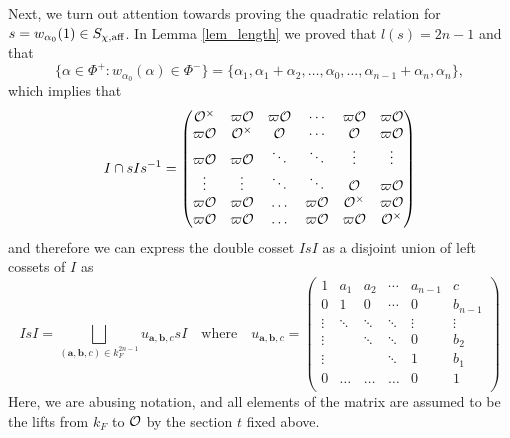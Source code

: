     Next, we turn out attention towards proving the quadratic relation for $s=w_{\alpha_0}(1)\in S_{\chi,\mathrm{aff}}$. In Lemma \ref{lem_length} we proved that $l(s)=2n-1$ and that 
    $$\{\alpha\in\Phi^+:w_{\alpha_0}(\alpha)\in\Phi^-\}=\{\alpha_1,\alpha_1+\alpha_2,\ldots,\alpha_0,\ldots,\alpha_{n-1}+\alpha_n,\alpha_n\},$$
    which implies that
    \begin{equation*}
        I\cap sI s^{-1}=\begin{pmatrix}
            \mathcal{O}^\times&\varpi\mathcal{O}&\varpi\mathcal{O}&\cdots&\varpi\mathcal{O}&\varpi\mathcal{O}\\
            \varpi\mathcal{O}&\mathcal{O}^\times&\mathcal{O}&\cdots&\mathcal{O}&\varpi\mathcal{O}\\
            \varpi\mathcal{O}&\varpi\mathcal{O}&\ddots&\ddots&\vdots&\vdots\\
            \vdots&\vdots&\ddots&\ddots&\mathcal{O}&\varpi\mathcal{O}\\
            \varpi\mathcal{O}&\varpi\mathcal{O}&\ldots&\varpi\mathcal{O}&\mathcal{O}^\times&\varpi\mathcal{O}\\
           \varpi\mathcal{O}&\varpi\mathcal{O}&\ldots&\varpi\mathcal{O}&\varpi\mathcal{O}&\mathcal{O}^\times\\
        \end{pmatrix}
    \end{equation*}
    and therefore we can express the double cosset $IsI$ as a disjoint union of left cossets of $I$ as
    \begin{equation*}
        IsI=\bigsqcup_{(\mathbf{a},\mathbf{b},c)\in k_F^{2n-1}}u_{\mathbf{a},\mathbf{b},c}sI\quad\text{where}\quad u_{\mathbf{a},\mathbf{b},c}=\begin{pmatrix}
            1&a_1&a_2&\cdots&a_{n-1}&c\\
            0&1&0&\cdots&0&b_{n-1}\\
            \vdots&\ddots&\ddots&\ddots&\vdots&\vdots\\
            \vdots&&\ddots&\ddots&0&b_2\\
            \vdots&&&\ddots&1&b_1\\
            0&\ldots&\ldots&\ldots&0&1\\
        \end{pmatrix}
    \end{equation*}
    Here, we are abusing notation, and all elements of the matrix are assumed to be the lifts from $k_F$ to $\mathcal{O}$ by the section $t$ fixed above.
